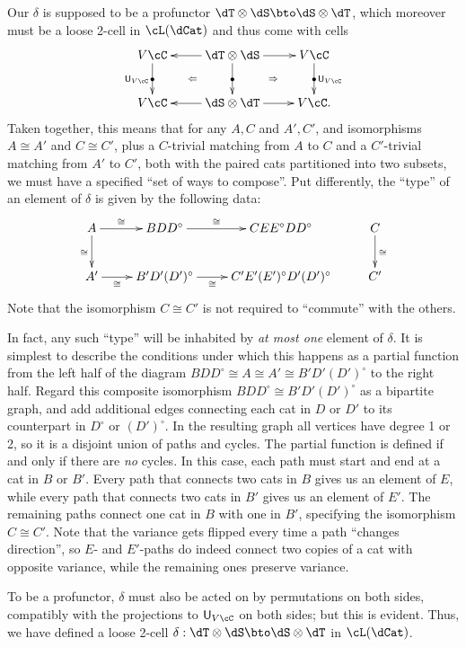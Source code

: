 \documentclass{amsart}
\let\ocomp\otimes
\newcommand{\C}{\cC}
\newcommand{\hunit}[1]{\mathsf{U}_{#1}}
\newcommand{\dl}{\delta}
\renewcommand{\o}{^{\circ}}
\begin{document}
Our $\delta$ is supposed to be a profunctor $\dT \ocomp \dS \bto \dS \ocomp \dT$, which moreover must be a loose 2-cell in $\cL(\dCat)$ and thus come with cells
\[ \xymatrix{ V\C \ar[d]|{\bullet}_{\hunit {V\C}} \ar@{}[dr]|{\Leftarrow} &
  \dT\ocomp \dS \ar[l] \ar[d]|{\bullet} \ar[r] \ar@{}[dr]|{\Rightarrow} &
  V\C \ar[d]|{\bullet}^{\hunit {V\C}}\\
  V\C & \dS\ocomp\dT \ar[l] \ar[r] & V\C. } \]
Taken together, this means that for any $A,C$ and $A',C'$, and isomorphisms $A\cong A'$ and $C\cong C'$, plus a $C$-trivial matching from $A$ to $C$ and a $C'$-trivial matching from $A'$ to $C'$, both with the paired cats partitioned into two subsets, we must have a specified ``set of ways to compose''.
Put differently, the ``type'' of an element of $\dl$ is given by the following data:
\begin{equation}
  \xymatrix{ A \ar[d]_\cong \ar[r]^-\cong & B D D\o \ar[r]^-\cong & C E E\o D D\o & C \ar[d]^\cong \\
    A' \ar[r]_-\cong & B' D' (D')\o \ar[r]_-\cong & C' E' (E')\o D' (D')\o & C' }\label{eq:dl-type-1}
\end{equation}
Note that the isomorphism $C\cong C'$ is not required to ``commute'' with the others.

In fact, any such ``type'' will be inhabited by \emph{at most one} element of $\dl$.
It is simplest to describe the conditions under which this happens as a partial function from the left half of the diagram $B D D\o \cong A\cong A' \cong B' D' (D')\o$ to the right half.
Regard this composite isomorphism $B D D\o \cong B' D' (D')\o$ as a bipartite graph, and add additional edges connecting each cat in $D$ or $D'$ to its counterpart in $D\o$ or $(D')\o$.
In the resulting graph all vertices have degree 1 or 2, so it is a disjoint union of paths and cycles.
The partial function is defined if and only if there are \emph{no} cycles.
In this case, each path must start and end at a cat in $B$ or $B'$.
Every path that connects two cats in $B$ gives us an element of $E$, while every path that connects two cats in $B'$ gives us an element of $E'$.
The remaining paths connect one cat in $B$ with one in $B'$, specifying the isomorphism $C\cong C'$.
Note that the variance gets flipped every time a path ``changes direction'', so $E$- and $E'$-paths do indeed connect two copies of a cat with opposite variance, while the remaining ones preserve variance.

To be a profunctor, $\dl$ must also be acted on by permutations on both sides, compatibly with the projections to $\hunit{V\C}$ on both sides; but this is evident.
Thus, we have defined a loose 2-cell $\dl : \dT \ocomp \dS \bto \dS \ocomp \dT$ in $\cL(\dCat)$.
\end{document}
